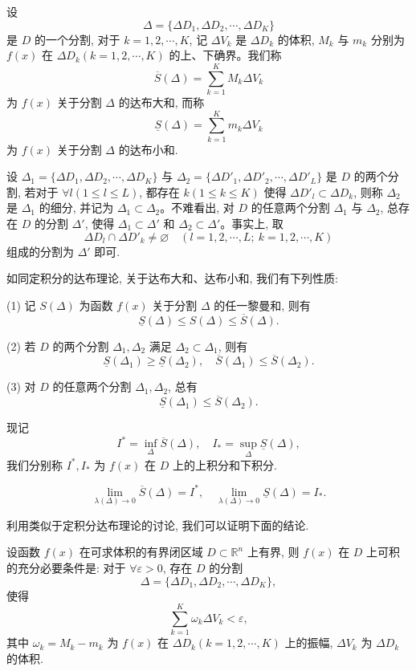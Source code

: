 设
\[
  \Delta=\{\Delta D_1,\Delta D_2,\cdots,\Delta D_K\}
\]
是 $D$ 的一个分割, 对于 $k=1,2,\cdots,K$, 记 $\Delta V_k$ 是 $\Delta D_k$ 的体积, $M_k$ 与 $m_k$ 分别为 $f(x)$ 在 $\Delta D_k(k=1,2,\cdots,K)$ 的上、下确界。我们称
\[
  \overline S(\Delta)=\sum_{k=1}^K M_k\Delta V_k
\]
为 $f(x)$ 关于分割 $\Delta$ 的达布大和, 而称
\[
  \underline S(\Delta)=\sum_{k=1}^K m_k\Delta V_k
\]
为 $f(x)$ 关于分割 $\Delta$ 的达布小和.

设 $\Delta_1=\{\Delta D_1,\Delta D_2,\cdots,\Delta D_K\}$ 与 $\Delta_2=\{\Delta D'_1,\Delta D'_2,\cdots,\Delta D'_L\}$ 是 $D$ 的两个分割, 若对于 $\forall l(1\leqslant l\leqslant L)$, 都存在 $k(1\leqslant k\leqslant K)$ 使得 $\Delta D'_l\subset\Delta D_k$, 则称 $\Delta_2$ 是 $\Delta_1$ 的细分, 并记为 $\Delta_1\subset\Delta_2$。不难看出, 对 $D$ 的任意两个分割 $\Delta_1$ 与 $\Delta_2$, 总存在 $D$ 的分割 $\Delta'$, 使得 $\Delta_1\subset\Delta'$ 和 $\Delta_2\subset\Delta'$。事实上, 取
\[
  \Delta D_l\cap\Delta D'_k\ne\varnothing\quad (l=1,2,\cdots,L;\ k=1,2,\cdots,K)
\]
组成的分割为 $\Delta'$ 即可.

如同定积分的达布理论, 关于达布大和、达布小和, 我们有下列性质:

(1) 记 $S(\Delta)$ 为函数 $f(x)$ 关于分割 $\Delta$ 的任一黎曼和, 则有
\[
  \underline S(\Delta)\leqslant S(\Delta)\leqslant\overline S(\Delta).
\]

(2) 若 $D$ 的两个分割 $\Delta_1,\Delta_2$ 满足 $\Delta_2\subset\Delta_1$, 则有
\[
  \underline S(\Delta_1)\geqslant\underline S(\Delta_2),\quad
  \overline S(\Delta_1)\leqslant\overline S(\Delta_2).
\]

(3) 对 $D$ 的任意两个分割 $\Delta_1,\Delta_2$, 总有
\[
  \underline S(\Delta_1)\leqslant\overline S(\Delta_2).
\]

现记
\[
  I^*=\inf_\Delta\overline S(\Delta),\quad
  I_*=\sup_\Delta\underline S(\Delta),
\]
我们分别称 $I^*,I_*$ 为 $f(x)$ 在 $D$ 上的上积分和下积分.

\begin{theorem}[{达布定理}]\label{theorem:ma-15-2-2}
\[
  \lim_{\lambda(\Delta)\to0}\overline S(\Delta)=I^*,\quad
  \lim_{\lambda(\Delta)\to0}\underline S(\Delta)=I_*.
\]
\end{theorem}

利用类似于定积分达布理论的讨论, 我们可以证明下面的结论.

\begin{theorem}\label{theorem:ma-15-2-3}
设函数 $f(x)$ 在可求体积的有界闭区域 $D\subset\mathbb R^n$ 上有界, 则 $f(x)$ 在 $D$ 上可积的充分必要条件是: 对于 $\forall\varepsilon>0$, 存在 $D$ 的分割
\[
  \Delta=\{\Delta D_1,\Delta D_2,\cdots,\Delta D_K\},
\]
使得
\[
  \sum_{k=1}^K\omega_k\Delta V_k<\varepsilon,
\]
其中 $\omega_k=M_k-m_k$ 为 $f(x)$ 在 $\Delta D_k(k=1,2,\cdots,K)$ 上的振幅, $\Delta V_k$ 为 $\Delta D_k$ 的体积.
\end{theorem}

